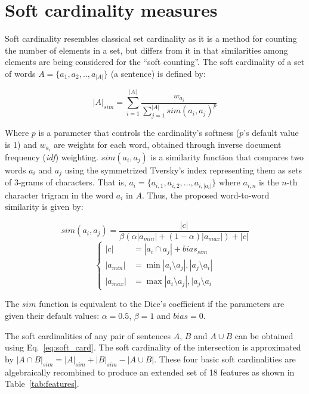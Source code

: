 
\section{Soft cardinality measures}
\label{sec:softcard}

Soft cardinality resembles classical set cardinality as it is a method
for counting the number of elements in a set, but differs from it
in that similarities among elements are being considered for
the ``soft counting''. 
The soft cardinality of a set of words 
$A=\{a_{1},a_{2},..,a_{|A|}\}$  (a sentence) is defined by:

\begin{equation}
|A|_{sim}=\sum_{i=1}^{|A|}\frac{w_{a_{i}}}{\sum_{j=1}^{|A|}sim(a_{i},a_{j})^{p}}\label{eq:soft_card}
\end{equation}

\noindent
Where $p$ is a parameter that controls the cardinality's softness ($p$'s default value is 1)
and $w_{a_{i}}$ are weights for each word,
obtained through inverse document frequency (\emph{idf}) weighting.
$sim(a_{i},a_{j})$ is a similarity function that compares two words $a_{i}$ and $a_{j}$
using the symmetrized Tversky's index \cite{tversky_features_1977,jimenez_softcardinality_core:_2013}
representing them as sets of 3-grams of characters. 
That is, $a_{i}=\{a_{i,1},a_{i,2},...,a_{i,|a_{i}|}\}$
where $a_{i,n}$ is the $n$-th character trigram in the word $a_{i}$ in $A$. 
Thus, the proposed word-to-word similarity is given by:

\begin{equation}
sim(a_{i},a_{j}) = \frac{|c|}{\beta(\alpha|a_{min}|+(1-\alpha)|a_{max}|)+|c|}\label{eq:symm_tversky}
\end{equation}
\begin{equation*}
\begin{cases}
|c| &= |a_{i}\cap a_{j}|+bias_{sim}\\
|a_{min}| &= \min{|a_{i}\setminus a_{j}|,|a_{j}\setminus a_{i}|}\\
|a_{max}| &= \max{|a_{i}\setminus a_{j}|,|a_{j}\setminus a_{i}}
\end{cases}
\end{equation*}

The $sim$ function is equivalent to the Dice's coefficient
if the parameters are given their default values:
$\alpha=0.5$, $\beta=1$ and $bias=0$.

The soft cardinalities of any pair of sentences $A$, $B$
and $A\cup B$ can be obtained using Eq.~\ref{eq:soft_card}. 
The soft cardinality of the intersection is approximated by 
$|A\cap B|_{sim}=|A|_{sim}+|B|_{sim}-|A\cup B|$.
These four basic soft cardinalities are algebraically recombined to produce
an extended set of 18 features as shown in Table~\ref{tab:features}. 

